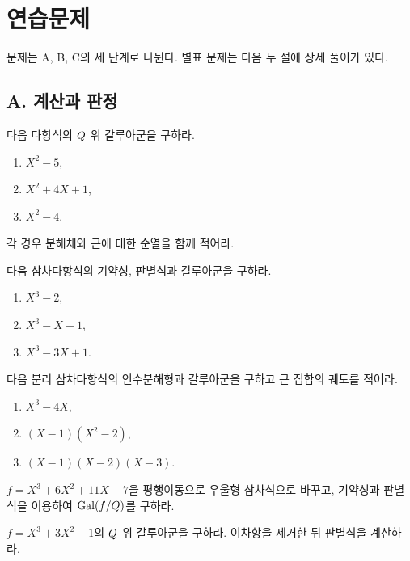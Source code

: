 \section{연습문제}
\label{sec:equation-groups-exercises}

문제는 A, B, C의 세 단계로 나뉜다. 별표 문제는 다음 두 절에 상세 풀이가 있다.

\subsection*{A. 계산과 판정}

\begin{exercise}[*]
다음 다항식의 $Q$ 위 갈루아군을 구하라.
\begin{enumerate}[label=(\alph*)]
  \item $X^2-5$,
  \item $X^2+4X+1$,
  \item $X^2-4$.
\end{enumerate}
각 경우 분해체와 근에 대한 순열을 함께 적어라.
\end{exercise}

\begin{exercise}[*]
다음 삼차다항식의 기약성, 판별식과 갈루아군을 구하라.
\begin{enumerate}[label=(\alph*)]
  \item $X^3-2$,
  \item $X^3-X+1$,
  \item $X^3-3X+1$.
\end{enumerate}
\end{exercise}

\begin{exercise}[*]
다음 분리 삼차다항식의 인수분해형과 갈루아군을 구하고 근 집합의 궤도를 적어라.
\begin{enumerate}[label=(\alph*)]
  \item $X^3-4X$,
  \item $(X-1)(X^2-2)$,
  \item $(X-1)(X-2)(X-3)$.
\end{enumerate}
\end{exercise}

\begin{exercise}
$f=X^3+6X^2+11X+7$을 평행이동으로 우울형 삼차식으로 바꾸고, 기약성과 판별식을 이용하여 $\operatorname{Gal}(f/Q)$를 구하라.
\end{exercise}

\begin{exercise}[*]
$f=X^3+3X^2-1$의 $Q$ 위 갈루아군을 구하라. 이차항을 제거한 뒤 판별식을 계산하라.
\end{exercise}

